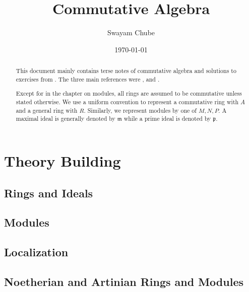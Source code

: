 \documentclass{report}
\title{Commutative Algebra}
\author{Swayam Chube}
\date{\today}
\begin{document}
\maketitle

\begin{abstract}
This document mainly contains terse notes of commutative algebra and solutions to exercises from \cite{atiyah-macdonald}. The three main references were \cite{atiyah-macdonald}, \cite{dummit-foote} and \cite{lang}. 

Except for in the chapter on modules, all rings are assumed to be commutative unless stated otherwise. We use a uniform convention to represent a commutative ring with $A$ and a general ring with $R$. Similarly, we represent modules by one of $M, N, P$. A maximal ideal is generally denoted by $\mathfrak m$ while a prime ideal is denoted by $\mathfrak p$.
\end{abstract}

\tableofcontents


\part{Theory Building}
\chapter{Rings and Ideals}


\chapter{Modules}


\chapter{Localization}


\chapter{Noetherian and Artinian Rings and Modules}


% 



\end{document}

